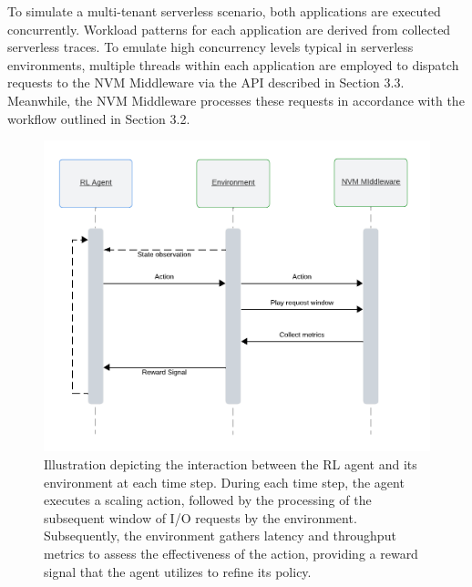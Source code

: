 To simulate a multi-tenant serverless scenario, both applications are executed concurrently. Workload patterns for each application are derived from collected serverless traces. To emulate high concurrency levels typical in serverless environments, multiple threads within each application are employed to dispatch requests to the NVM Middleware via the API described in Section 3.3. Meanwhile, the NVM Middleware processes these requests in accordance with the workflow outlined in Section 3.2.

\begin{figure}[ht]
  \centering
  \includegraphics[width=1\textwidth]{images/rl_sequence_flow.png}
  \caption[Reinforcement Learning Agent Process Flow]{Illustration depicting the interaction between the RL agent and its environment at each time step. During each time step, the agent executes a scaling action, followed by the processing of the subsequent window of I/O requests by the environment. Subsequently, the environment gathers latency and throughput metrics to assess the effectiveness of the action, providing a reward signal that the agent utilizes to refine its policy.}
  \label{fig:rl_sequence_flow}
\end{figure}

